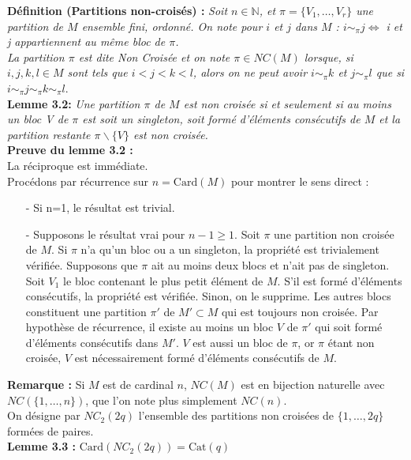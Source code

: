 \documentclass[10pt,a4paper]{article}
\begin{document}
\textbf{Définition (Partitions non-croisés) :} \textit{Soit $n \in \mathbb{N}$, et $\pi = \{V_1,\dots ,V_r\}$ une partition de $M$ ensemble fini, ordonné. On note pour $i$ et $j$ dans $M$ : $i \sim_{\pi} j \Leftrightarrow $ i et j appartiennent au même bloc de $\pi$.\\
La partition $\pi$ est dite Non Croisée et on note $\pi \in NC(M)$ lorsque, si $i,j,k,l \in M $ sont tels que $i < j < k < l$, alors on ne peut avoir $i \sim_{\pi} k$ et $j \sim_{\pi} l $ que si $ i \sim_{\pi} j \sim_{\pi} k \sim_{\pi} l.$ }\\

\textbf{Lemme 3.2:}\textit{ Une partition $\pi$ de $M$ est non croisée si et seulement si au moins un bloc V de $\pi$ est soit un singleton, soit formé d'éléments consécutifs de $M$ et la partition restante $\pi \backslash \{V\}$ est non croisée. }\\

\textbf{Preuve du lemme 3.2 :} \\
La réciproque est immédiate.\\
Procédons par récurrence sur $n = \text{Card}(M)$ pour montrer le sens direct : 
\begin{itemize}
\item[-] Si n=1, le résultat est trivial. 
\item[-] Supposons le résultat vrai pour $n-1 \geq 1$. Soit $\pi$ une partition non croisée de $M$. Si $\pi$ n'a qu'un bloc ou a un singleton, la propriété est trivialement vérifiée. Supposons que $\pi$ ait au moins deux blocs et n'ait pas de singleton. Soit $V_1$ le bloc contenant le plus petit élément de $M$. S'il est formé d'éléments consécutifs, la propriété est vérifiée. Sinon, on le supprime. Les autres blocs constituent une partition $\pi'$ de $M'\subset M $ qui est toujours non croisée. Par hypothèse de récurrence, il existe au moins un bloc $V$ de $\pi'$ qui soit formé d'éléments consécutifs dans $M'$. $V$ est aussi un bloc de $\pi$, or $\pi$ étant non croisée, $V$ est nécessairement formé d'éléments consécutifs de $M$.
\end{itemize}

\textbf{Remarque :} Si $M$ est de cardinal $n$, $NC(M)$ est en bijection naturelle avec $NC(\{1,\dots,n\})$, que l'on note plus simplement $NC(n)$.\\
On désigne par $NC_2(2q)$ l'ensemble des partitions non croisées de $\{1,\dots,2q\}$ formées de paires.\\

\textbf{Lemme 3.3 :} \textit{$\text{Card} (NC_2(2q)) = \text{Cat}(q) $}\\
\end{document}
